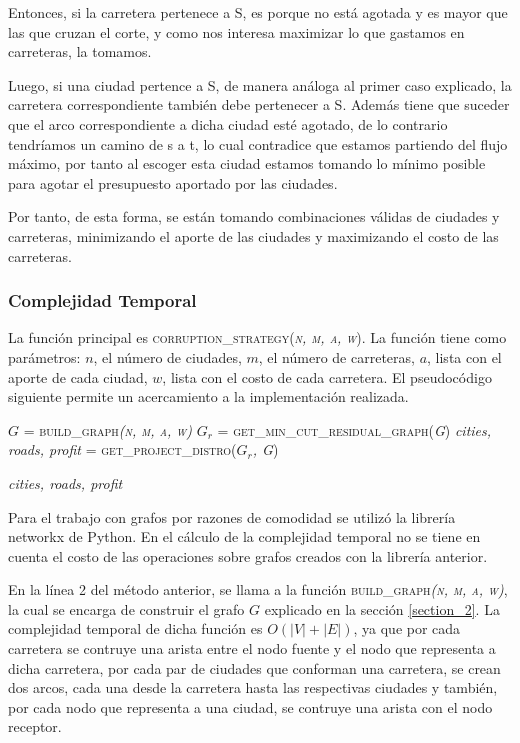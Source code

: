 \documentclass[10pt]{article} %
\begin{document}
	Entonces, si la carretera pertenece a S, es porque no est\'a agotada y es mayor que las que cruzan el corte, y como nos interesa maximizar lo que gastamos en carreteras, la tomamos.
	
	Luego, si una ciudad pertence a S, de manera an\'aloga al primer caso explicado, la carretera correspondiente tambi\'en debe pertenecer a S. Adem\'as tiene que suceder que el arco correspondiente a dicha ciudad est\'e agotado, de lo contrario tendr\'iamos un camino de s a t, lo cual contradice que estamos partiendo del flujo m\'aximo, por tanto al escoger esta ciudad estamos tomando lo m\'inimo posible para agotar el presupuesto aportado por las ciudades. 
	 
	Por tanto, de esta forma, se est\'an tomando combinaciones v\'alidas de ciudades y carreteras, minimizando el aporte de las ciudades y maximizando el costo de las carreteras.
	\subsubsection{Complejidad Temporal}
	
	La funci\'on principal es \textsc{corruption\_strategy(\textit{n, m, a, w})}. La funci\'on tiene como par\'ametros: $n$, el n\'umero de ciudades, $m$, el n\'umero de carreteras, $a$, lista con el aporte de cada ciudad, $w$, lista con el costo de cada carretera. El pseudoc\'odigo siguiente permite un acercamiento a la implementaci\'on realizada.
	
	\begin{algorithmic}[1]
		
		\State $G$ = \textsc{build\_graph\textit{(n, m, a, w)}}
		\State $G_r$ =\textsc{ get\_min\_cut\_residual\_graph(\textit{G})}
		\State \textit{cities, roads, profit} = \textsc{get\_project\_distro(\textit{$G_r$, G})}
		
		\Return \textit{cities, roads, profit}
		\EndFunction
	\end{algorithmic}

	Para el trabajo con grafos por razones de comodidad se utilizó la librería networkx de Python.	En el cálculo de la complejidad temporal no se tiene en cuenta el costo de las operaciones sobre
	grafos creados con la librería anterior.
	
	En la l\'inea 2 del m\'etodo anterior, se llama a la funci\'on \textsc{build\_graph\textit{(n, m, a, w)}}, la cual se encarga de construir el grafo $G$ explicado en la secci\'on \ref{section_2}. La complejidad temporal de dicha funci\'on es $O(|V| + |E|)$, ya que por cada carretera se contruye una arista entre el nodo fuente y el nodo que representa a dicha carretera,  por cada par de ciudades que conforman una carretera, se crean dos arcos, cada una desde la carretera hasta las respectivas ciudades y tambi\'en, por cada nodo que representa a una ciudad, se contruye una arista con el nodo receptor.
	
\end{document}
